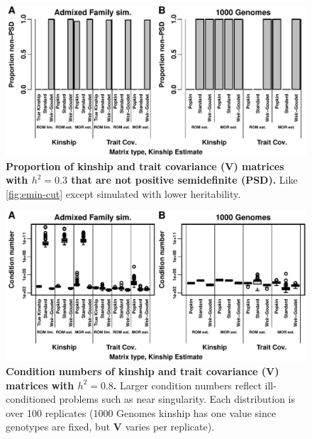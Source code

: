 \documentclass[11pt]{article}
\begin{document}
\begin{figure}[bp!]
  \centering
  \includegraphics[width=\textwidth]{h-0.3/emin-cut.pdf}
  \caption{
    {\bf Proportion of kinship and trait covariance ($\mathbf{V}$) matrices with $h^2=0.3$ that are not positive semidefinite (PSD).}
    Like \cref{fig:emin-cut} except simulated with lower heritability.
  }
  \label{fig:emin-cut-h3}
\end{figure}

\begin{figure}[bp!]
  \centering
  \includegraphics[width=\textwidth]{kappa.pdf}
  \caption{
    {\bf Condition numbers of kinship and trait covariance ($\mathbf{V}$) matrices with $h^2=0.8$.}
    Larger condition numbers reflect ill-conditioned problems such as near singularity.
    Each distribution is over 100 replicates (1000 Genomes kinship has one value since genotypes are fixed, but $\mathbf{V}$ varies per replicate).
  }
  \label{fig:kappa}
\end{figure}
\end{document}
